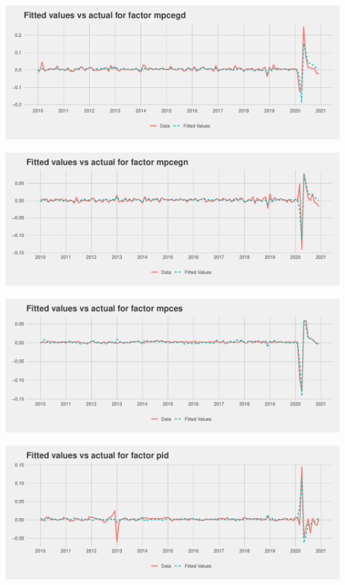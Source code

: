 \documentclass[11pt, letterpaper]{article}\usepackage[]{graphicx}\usepackage[]{color}
\begin{document}
{\centering \includegraphics[width=5in,height=2in]{figure/unnamed-chunk-20-3} 

}




{\centering \includegraphics[width=5in,height=2in]{figure/unnamed-chunk-20-4} 

}




{\centering \includegraphics[width=5in,height=2in]{figure/unnamed-chunk-20-5} 

}




{\centering \includegraphics[width=5in,height=2in]{figure/unnamed-chunk-20-6} 

}
\end{document}

